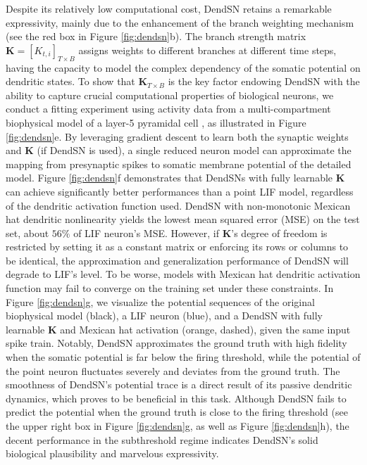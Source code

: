 Despite its relatively low computational cost, DendSN retains a remarkable expressivity, mainly due to the enhancement of the branch weighting mechanism (see the red box in Figure \ref{fig:dendsn}b). The branch strength matrix $\mathbf{K}=[K_{t,i}]_{T\times B}$ assigns weights to different branches at different time steps, having the capacity to model the complex dependency of the somatic potential on dendritic states. To show that $\mathbf{K}_{T\times B}$ is the key factor endowing DendSN with the ability to capture crucial computational properties of biological neurons, we conduct a fitting experiment using activity data from a multi-compartment biophysical model of a layer-5 pyramidal cell \cite{beniaguev2021cortical}, as illustrated in Figure \ref{fig:dendsn}e. By leveraging gradient descent to learn both the synaptic weights and $\mathbf{K}$ (if DendSN is used), a single reduced neuron model can approximate the mapping from presynaptic spikes to somatic membrane potential of the detailed model. Figure \ref{fig:dendsn}f demonstrates that DendSNs with fully learnable $\mathbf{K}$ can achieve significantly better performances than a point LIF model, regardless of the dendritic activation function used. DendSN with non-monotonic Mexican hat dendritic nonlinearity yields the lowest mean squared error (MSE) on the test set, about $56\%$ of LIF neuron's MSE. However, if $\mathbf{K}$'s degree of freedom is restricted by setting it as a constant matrix or enforcing its rows or columns to be identical, the approximation and generalization performance of DendSN will degrade to LIF's level. To be worse, models with Mexican hat dendritic activation function may fail to converge on the training set under these constraints. In Figure \ref{fig:dendsn}g, we visualize the potential sequences of the original biophysical model (black), a LIF neuron (blue), and a DendSN with fully learnable $\mathbf{K}$ and Mexican hat activation (orange, dashed), given the same input spike train. Notably, DendSN approximates the ground truth with high fidelity when the somatic potential is far below the firing threshold, while the potential of the point neuron fluctuates severely and deviates from the ground truth. The smoothness of DendSN's potential trace is a direct result of its passive dendritic dynamics, which proves to be beneficial in this task. Although DendSN fails to predict the potential when the ground truth is close to the firing threshold (see the upper right box in Figure \ref{fig:dendsn}g, as well as Figure \ref{fig:dendsn}h), the decent performance in the subthreshold regime indicates DendSN's solid biological plausibility and marvelous expressivity.

